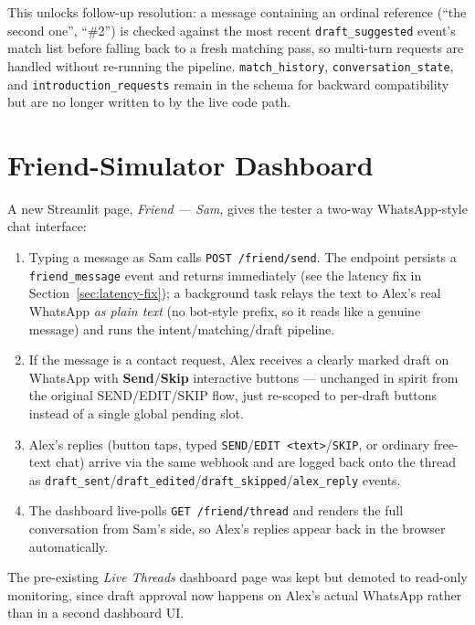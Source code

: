 \documentclass[12pt, a4paper]{report}
\begin{document}
This unlocks follow-up resolution: a message containing an ordinal reference (``the second one'', ``\#2'') is checked against the most recent \texttt{draft\_suggested} event's match list before falling back to a fresh matching pass, so multi-turn requests are handled without re-running the pipeline. \texttt{match\_history}, \texttt{conversation\_state}, and \texttt{introduction\_requests} remain in the schema for backward compatibility but are no longer written to by the live code path.

\section{Friend-Simulator Dashboard}

A new Streamlit page, \emph{Friend --- Sam}, gives the tester a two-way WhatsApp-style chat interface:

\begin{enumerate}[itemsep=3pt]
    \item Typing a message as Sam calls \texttt{POST /friend/send}. The endpoint persists a \texttt{friend\_message} event and returns immediately (see the latency fix in Section~\ref{sec:latency-fix}); a background task relays the text to Alex's real WhatsApp \emph{as plain text} (no bot-style prefix, so it reads like a genuine message) and runs the intent/matching/draft pipeline.
    \item If the message is a contact request, Alex receives a clearly marked draft on WhatsApp with \textbf{Send}/\textbf{Skip} interactive buttons --- unchanged in spirit from the original SEND/EDIT/SKIP flow, just re-scoped to per-draft buttons instead of a single global pending slot.
    \item Alex's replies (button taps, typed \texttt{SEND}/\texttt{EDIT~<text>}/\texttt{SKIP}, or ordinary free-text chat) arrive via the same webhook and are logged back onto the thread as \texttt{draft\_sent}/\texttt{draft\_edited}/\texttt{draft\_skipped}/\texttt{alex\_reply} events.
    \item The dashboard live-polls \texttt{GET /friend/thread} and renders the full conversation from Sam's side, so Alex's replies appear back in the browser automatically.
\end{enumerate}

The pre-existing \emph{Live Threads} dashboard page was kept but demoted to read-only monitoring, since draft approval now happens on Alex's actual WhatsApp rather than in a second dashboard UI.
\end{document}
